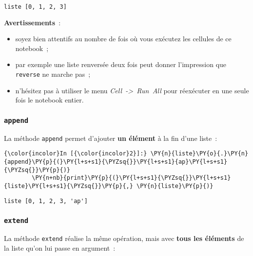     \begin{Verbatim}[commandchars=\\\{\}]
liste [0, 1, 2, 3]

    \end{Verbatim}

    \textbf{Avertissements}~:

\begin{itemize}
\tightlist
\item
  soyez bien attentifs au nombre de fois où vous exécutez les cellules
  de ce notebook~;
\item
  par exemple une liste renversée deux fois peut donner l'impression que
  \texttt{reverse} ne marche pas~;
\item
  n'hésitez pas à utiliser le menu \emph{Cell~-\textgreater{}~Run~All}
  pour réexécuter en une seule fois le notebook entier.
\end{itemize}

    \hypertarget{append}{%
\subsubsection{\texorpdfstring{\texttt{append}}{append}}\label{append}}

    La méthode \texttt{append} permet d'ajouter \textbf{un élément} à la fin
d'une liste~:

    \begin{Verbatim}[commandchars=\\\{\}]
{\color{incolor}In [{\color{incolor}2}]:} \PY{n}{liste}\PY{o}{.}\PY{n}{append}\PY{p}{(}\PY{l+s+s1}{\PYZsq{}}\PY{l+s+s1}{ap}\PY{l+s+s1}{\PYZsq{}}\PY{p}{)}
        \PY{n+nb}{print}\PY{p}{(}\PY{l+s+s1}{\PYZsq{}}\PY{l+s+s1}{liste}\PY{l+s+s1}{\PYZsq{}}\PY{p}{,} \PY{n}{liste}\PY{p}{)}
\end{Verbatim}


    \begin{Verbatim}[commandchars=\\\{\}]
liste [0, 1, 2, 3, 'ap']

    \end{Verbatim}

    \hypertarget{extend}{%
\subsubsection{\texorpdfstring{\texttt{extend}}{extend}}\label{extend}}

    La méthode \texttt{extend} réalise la même opération, mais avec
\textbf{tous les éléments} de la liste qu'on lui passe en argument~:

